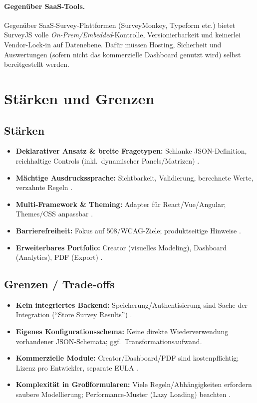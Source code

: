\documentclass[11pt,a4paper]{article}
\begin{document}
\paragraph{Gegenüber SaaS-Tools.} Gegenüber SaaS-Survey-Plattformen (SurveyMonkey, Typeform etc.) bietet SurveyJS volle \emph{On-Prem/Embedded}-Kontrolle, Versionierbarkeit und keinerlei Vendor-Lock-in auf Datenebene. Dafür müssen Hosting, Sicherheit und Auswertungen (sofern nicht das kommerzielle Dashboard genutzt wird) selbst bereitgestellt werden.

\section{Stärken und Grenzen}
\subsection*{Stärken}
\begin{itemize}
  \item \textbf{Deklarativer Ansatz \& breite Fragetypen:} Schlanke JSON-Definition, reichhaltige Controls (inkl.\ dynamischer Panels/Matrizen) \cite{surveyjs-form-library}.
  \item \textbf{Mächtige Ausdruckssprache:} Sichtbarkeit, Validierung, berechnete Werte, verzahnte Regeln \cite{surveyjs-docs-expressions, surveyjs-docs-conditional}.
  \item \textbf{Multi-Framework \& Theming:} Adapter für React/Vue/Angular; Themes/CSS anpassbar \cite{surveyjs-form-library, surveyjs-themes-styles}.
  \item \textbf{Barrierefreiheit:} Fokus auf 508/WCAG-Ziele; produktseitige Hinweise \cite{surveyjs-accessibility, surveyjs-products}.
  \item \textbf{Erweiterbares Portfolio:} Creator (visuelles Modeling), Dashboard (Analytics), PDF (Export) \cite{surveyjs-products, surveyjs-licensing}.
\end{itemize}

\subsection*{Grenzen / Trade-offs}
\begin{itemize}
  \item \textbf{Kein integriertes Backend:} Speicherung/Authentisierung sind Sache der Integration (\enquote{Store Survey Results}) \cite{surveyjs-store-results, surveyjs-servers}.
  \item \textbf{Eigenes Konfigurationsschema:} Keine direkte Wiederverwendung vorhandener JSON-Schemata; ggf.\ Transformationsaufwand.
  \item \textbf{Kommerzielle Module:} Creator/Dashboard/PDF sind kostenpflichtig; Lizenz pro Entwickler, separate EULA \cite{surveyjs-licensing, surveyjs-eula}.
  \item \textbf{Komplexität in Großformularen:} Viele Regeln/Abhängigkeiten erfordern saubere Modellierung; Performance-Muster (Lazy Loading) beachten \cite{surveyjs-lazy-loading}.
\end{itemize}
\end{document}
